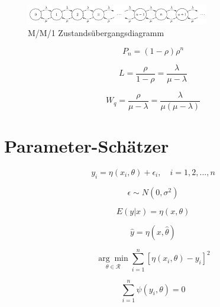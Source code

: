 \begin{figure}[h]
	\centering
	\includegraphics[width=8cm]{bilder/mm1_state}
	\caption{M/M/1 Zustandsübergangsdiagramm}
  \label{fig:mm1_state}
\end{figure}

\begin{equation}
P_n = (1 - \rho) \rho^n
\end{equation}

\begin{equation}
L = \frac{
	\rho
}{
	1 - \rho
} = \frac{
	\lambda
}{
	\mu - \lambda
}
\end{equation}

\begin{equation}
W_q = \frac{
	\rho
}{
	\mu - \lambda
} = \frac{
	\lambda
}{
	\mu ( \mu - \lambda )
}
\end{equation}

\section{Parameter-Schätzer}

\begin{equation}
y_i = \eta(x_i, \theta)+ \epsilon_i, \quad i=1,2,...,n
\end{equation}

\begin{equation}
\epsilon \sim N(0, \sigma^2)
\end{equation}

\begin{equation}
E(y | x) = \eta(x, \theta)
\end{equation}

\begin{equation}
\hat{y} = \eta(x, \hat{\theta})
\end{equation}

\begin{equation}
\underset{\theta \in \mathcal{R}}{\arg\min} \sum_{i=1}^n \left[ \eta(x_i,\theta) - y_i \right]^2
\end{equation}

\begin{equation}
\sum_{i=1}^n \psi(y_i, \theta) = 0
\end{equation}

